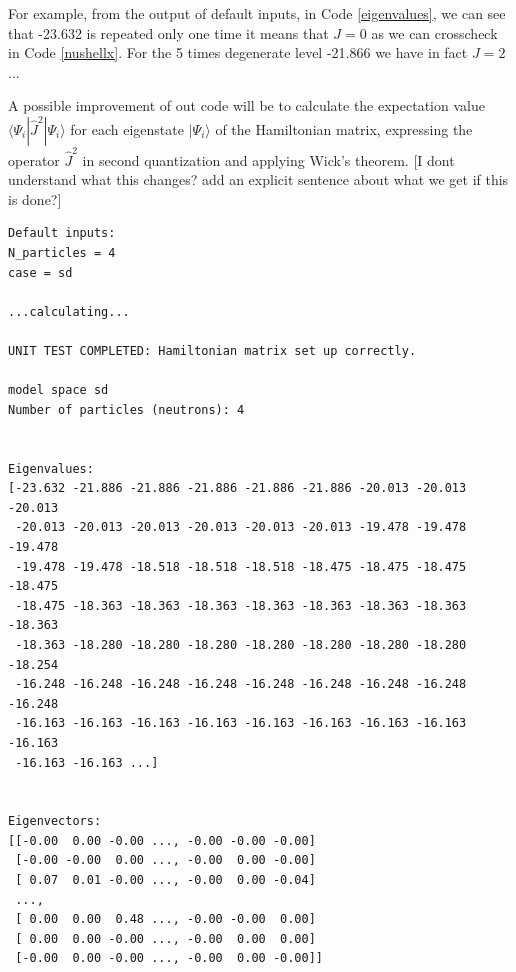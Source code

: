 \documentclass[twoside]{article}
\newcommand{\bra}[1]{\langle #1 |}
\newcommand{\ket}[1]{| #1 \rangle}
\begin{document}
For example, from the output of default inputs, in Code \ref{eigenvalues}, we can see that -23.632 is repeated only one time it means that $J=0$ as we can crosscheck in Code \ref{nushellx}. For the 5 times degenerate level -21.866 we have in fact $J=2$ ...

A possible improvement of out code will be to calculate the expectation value $\bra{\Psi_i} \hat J^2 \ket{\Psi_i}$ for each eigenstate $\ket{\Psi_i}$ of the Hamiltonian matrix, expressing the operator $\hat J^2$ in second quantization and applying Wick's theorem. [I dont understand what this changes? add an explicit sentence about what we get if this is done?]

\begin{lstlisting}[label=eigenvalues,caption= example of the output from \texttt{main.py} when it is run with default inputs. To be noticed the degenerate eigenvalues.]
Default inputs: 
N_particles = 4 
case = sd 

...calculating...

UNIT TEST COMPLETED: Hamiltonian matrix set up correctly.

model space sd
Number of particles (neutrons): 4


Eigenvalues:
[-23.632 -21.886 -21.886 -21.886 -21.886 -21.886 -20.013 -20.013 -20.013
 -20.013 -20.013 -20.013 -20.013 -20.013 -20.013 -19.478 -19.478 -19.478
 -19.478 -19.478 -18.518 -18.518 -18.518 -18.475 -18.475 -18.475 -18.475
 -18.475 -18.363 -18.363 -18.363 -18.363 -18.363 -18.363 -18.363 -18.363
 -18.363 -18.280 -18.280 -18.280 -18.280 -18.280 -18.280 -18.280 -18.254
 -16.248 -16.248 -16.248 -16.248 -16.248 -16.248 -16.248 -16.248 -16.248
 -16.163 -16.163 -16.163 -16.163 -16.163 -16.163 -16.163 -16.163 -16.163
 -16.163 -16.163 ...]


Eigenvectors:
[[-0.00  0.00 -0.00 ..., -0.00 -0.00 -0.00]
 [-0.00 -0.00  0.00 ..., -0.00  0.00 -0.00]
 [ 0.07  0.01 -0.00 ..., -0.00  0.00 -0.04]
 ..., 
 [ 0.00  0.00  0.48 ..., -0.00 -0.00  0.00]
 [ 0.00  0.00 -0.00 ..., -0.00  0.00  0.00]
 [-0.00  0.00 -0.00 ..., -0.00  0.00 -0.00]]
\end{lstlisting}
\end{document}
